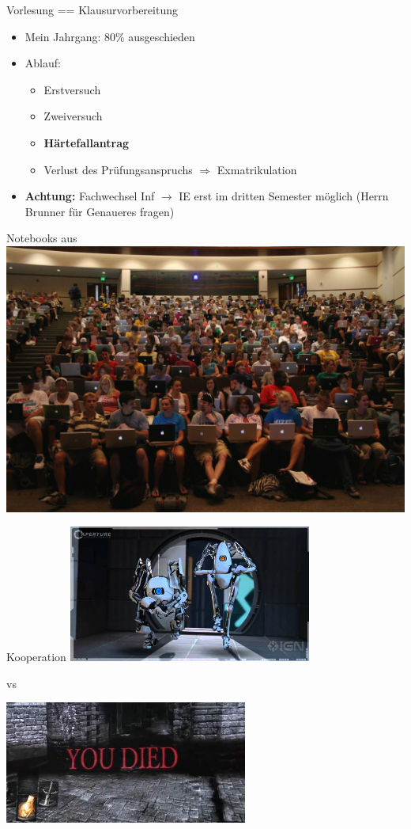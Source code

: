 \documentclass{beamer}
\begin{document}
\begin{frame}{Vorlesung == Klausurvorbereitung}
\begin{itemize}
\item Mein Jahrgang: 80\% ausgeschieden
\item Ablauf:
	\begin{itemize}
	\item Erstversuch
	\item Zweiversuch
	\item \textbf{Härtefallantrag}
	\item Verlust des Prüfungsanspruchs $\Rightarrow$ Exmatrikulation
	\end{itemize}
\item \textbf{Achtung:} Fachwechsel Inf $\rightarrow$ IE erst im dritten Semester möglich (Herrn Brunner für Genaueres fragen)
\end{itemize}
\end{frame}

\begin{frame}{Notebooks aus}
\includegraphics[width=\textwidth]{img/notebooks.jpg}
\end{frame}

\begin{frame}{Kooperation}
\centering
\includegraphics[width=0.6\textwidth]{img/coop.jpg}

vs
\vspace{0.25cm}

\includegraphics[width=0.6\textwidth]{img/coop_youdied.jpg}
\end{frame}
\end{document}
